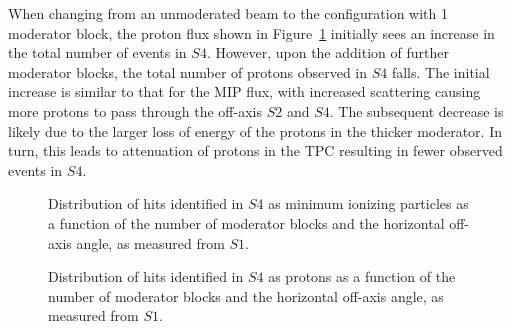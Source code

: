 When changing from an unmoderated beam to the configuration with 1 moderator block, the proton flux shown in Figure~\ref{fig:thetas4pro} initially sees an increase in the total number of events in $\mathit{S4}$.
However, upon the addition of further moderator blocks, the total number of protons observed in $\mathit{S4}$ falls.
The initial increase is similar to that for the MIP flux, with increased scattering causing more protons to pass through the off-axis $\mathit{S2}$ and $\mathit{S4}$.
The subsequent decrease is likely due to the larger loss of energy of the protons in the thicker moderator.
In turn, this leads to attenuation of protons in the TPC resulting in fewer observed events in $\mathit{S4}$.

\begin{figure}[!ht]
  \begin{minipage}[t]{0.48\textwidth}
    \begin{adjustbox}{max totalsize={\textwidth}{.35\textheight},center}
      
    \end{adjustbox}
    \caption{Distribution of hits identified in $\mathit{S4}$ as minimum ionizing particles as a function of the number of moderator blocks and the horizontal off-axis angle, as measured from $\mathit{S1}$.}
    \label{fig:thetas4mip}
  \end{minipage}
  \hspace{0.3cm}
  \begin{minipage}[t]{0.48\textwidth}
    \begin{adjustbox}{max totalsize={\textwidth}{.35\textheight},center}
      
    \end{adjustbox}
    \caption{Distribution of hits identified in $\mathit{S4}$ as protons as a function of the number of moderator blocks and the horizontal off-axis angle, as measured from $\mathit{S1}$.}
    \label{fig:thetas4pro}
  \end{minipage} 
\end{figure}	

